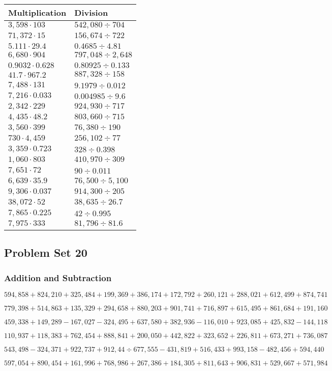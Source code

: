 \begin{longtable}[]{@{}ll@{}}
\toprule
Multiplication & Division\tabularnewline
\midrule
\endhead
\(3,598\cdot103\) & \(542,080÷704\)\tabularnewline
\(71,372\cdot15\) & \(156,674÷722\)\tabularnewline
\(5.111\cdot29.4\) & \(0.4685÷4.81\)\tabularnewline
\(6,680\cdot904\) & \(797,048÷2,648\)\tabularnewline
\(0.9032\cdot0.628\) & \(0.80925÷0.133\)\tabularnewline
\(41.7\cdot967.2\) & \(887,328÷158\)\tabularnewline
\(7,488\cdot131\) & \(9.1979÷0.012\)\tabularnewline
\(7,216\cdot0.033\) & \(0.004985÷9.6\)\tabularnewline
\(2,342\cdot229\) & \(924,930÷717\)\tabularnewline
\(4,435\cdot48.2\) & \(803,660÷715\)\tabularnewline
\(3,560\cdot399\) & \(76,380÷190\)\tabularnewline
\(730\cdot4,459\) & \(256,102÷77\)\tabularnewline
\(3,359\cdot0.723\) & \(328÷0.398\)\tabularnewline
\(1,060\cdot803\) & \(410,970÷309\)\tabularnewline
\(7,651\cdot72\) & \(90÷0.011\)\tabularnewline
\(6,639\cdot35.9\) & \(76,500÷5,100\)\tabularnewline
\(9,306\cdot0.037\) & \(914,300÷205\)\tabularnewline
\(38,072\cdot52\) & \(38,635÷26.7\)\tabularnewline
\(7,865\cdot0.225\) & \(42÷0.995\)\tabularnewline
\(7,975\cdot333\) & \(81,796÷81.6\)\tabularnewline
\bottomrule
\end{longtable}

\hypertarget{problem-set-20-5}{%
\subsection{Problem Set 20}\label{problem-set-20-5}}

\hypertarget{addition-and-subtraction-325}{%
\subsubsection{Addition and
Subtraction}\label{addition-and-subtraction-325}}

\(594,858+824,210+325,484+199,369+386,174+172,792+260,121+288,021+612,499+ 874,741\)

\(779,398+514,863+135,329+294,658+880,203+901,741+716,897+615,495+861,684+191,160\)

\(459,338+149,289-167,027-324,495+637,580+382,936-116,010+923,085+425,832-144,118\)

\(110,937+118,383+762,454+888,841+200,050+442,822+323,652+226,811+673,271+736,087\)

\(543,498-324,371+922,737+912,44÷677,555-431,819+516,433+993,158-482,456+594,440\)

\(597,054+890,454+161,996+768,986+267,386+184,305+811,643+906,831+529,667+571,984\)

